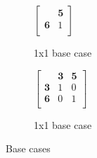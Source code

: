 \documentclass[11pt, oneside]{article} 	%
\begin{document}
\begin{figure}
\centering
\begin{subfigure}{.5\textwidth}
  \centering
  

$ \left[\begin{array}{cc}
                        &  \mathbf{5}\\ 
                        \mathbf{6} & 1\\
                      \end{array}\right] 
$

  \caption{1x1 base case}
\label{fig:basecase_1x1}
\end{subfigure}
\begin{subfigure}{.5\textwidth}
  \centering

$ \left[\begin{array}{ccc}
                        & \mathbf{3} & \mathbf{5}\\ 
                       \mathbf{3} & 1 & 0\\
                        \mathbf{6} & 0 & 1\\
                      \end{array}\right] 
$
  \caption{1x1 base case}
\label{fig:basecase_1x1}
\end{subfigure}
\caption{Base cases}
\label{fig:base}
\end{figure}
\end{document}

